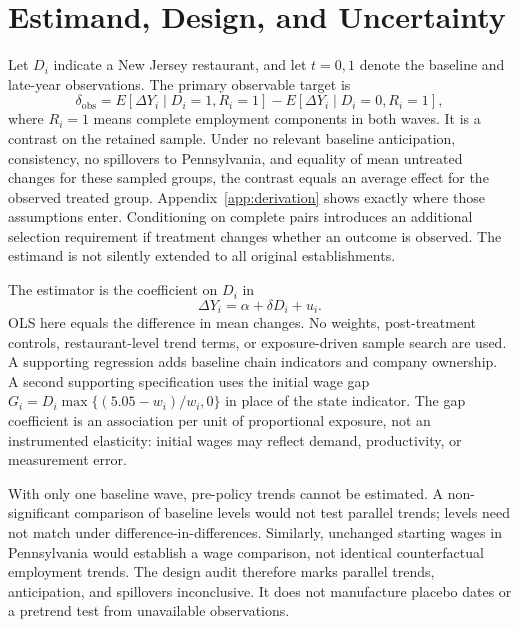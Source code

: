 \documentclass[11pt]{article}
\begin{document}
\section{Estimand, Design, and Uncertainty}
Let $D_i$ indicate a New Jersey restaurant, and let $t=0,1$ denote the baseline and late-year observations. The primary observable target is
\begin{equation}
\delta_{\mathrm{obs}}=E[\Delta Y_i\mid D_i=1,R_i=1]
-E[\Delta Y_i\mid D_i=0,R_i=1],
\label{eq:did}
\end{equation}
where $R_i=1$ means complete employment components in both waves. It is a contrast on the retained sample. Under no relevant baseline anticipation, consistency, no spillovers to Pennsylvania, and equality of mean untreated changes for these sampled groups, the contrast equals an average effect for the observed treated group. Appendix~\ref{app:derivation} shows exactly where those assumptions enter. Conditioning on complete pairs introduces an additional selection requirement if treatment changes whether an outcome is observed. The estimand is not silently extended to all original establishments. %

The estimator is the coefficient on $D_i$ in
\begin{equation}
\Delta Y_i=\alpha+\delta D_i+u_i.
\label{eq:reg}
\end{equation}
OLS here equals the difference in mean changes. No weights, post-treatment controls, restaurant-level trend terms, or exposure-driven sample search are used. A supporting regression adds baseline chain indicators and company ownership. A second supporting specification uses the initial wage gap $G_i=D_i\max\{(5.05-w_i)/w_i,0\}$ in place of the state indicator. The gap coefficient is an association per unit of proportional exposure, not an instrumented elasticity: initial wages may reflect demand, productivity, or measurement error. %

With only one baseline wave, pre-policy trends cannot be estimated. A non-significant comparison of baseline levels would not test parallel trends; levels need not match under difference-in-differences. Similarly, unchanged starting wages in Pennsylvania would establish a wage comparison, not identical counterfactual employment trends. The design audit therefore marks parallel trends, anticipation, and spillovers inconclusive. It does not manufacture placebo dates or a pretrend test from unavailable observations. %
\end{document}
